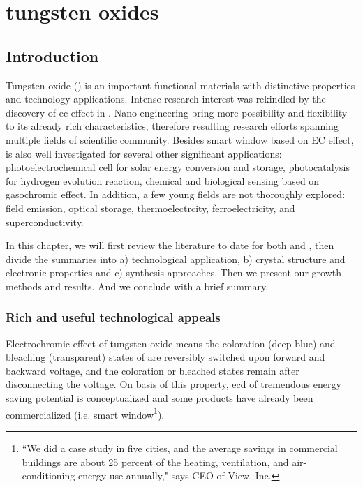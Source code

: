 
\chapter{tungsten oxides}

\section{Introduction}

Tungsten oxide () is an important functional materials with distinctive properties and technology applications. Intense research interest was rekindled by the discovery of \gls{ec} effect in \citeyear{Granqvist1993}.\cite{Granqvist1993}  Nano-engineering  bring more possibility and flexibility to its already rich characteristics, therefore resulting research efforts spanning multiple fields of scientific community. Besides smart window based on EC effect,  is also well investigated for several other significant applications: photoelectrochemical cell for solar energy conversion and storage, photocatalysis for hydrogen evolution reaction, chemical and biological sensing based on gasochromic effect. In addition, a few young fields are not thoroughly explored: field emission, optical storage, thermoelectrcity, ferroelectricity, and superconductivity.

In this chapter, we will first review the literature to date for both  and , then divide the summaries into a) technological application, b) crystal structure and electronic properties and c) synthesis approaches. Then we present our growth methods and results. And we conclude with a brief summary.

\subsection{Rich and useful technological appeals}

Electrochromic effect of tungsten oxide means the coloration (deep blue) and bleaching (transparent) states of  are reversibly switched upon forward and backward voltage, and the coloration or bleached states remain after disconnecting the voltage. On basis of this property, \gls{ecd} of tremendous energy saving potential is conceptualized and some products have already been commercialized (i.e. smart window\footnote{``We did a case study in five cities, and the average savings in commercial buildings are about 25 percent of the heating, ventilation, and air-conditioning energy use annually," says CEO of View, Inc.}).

